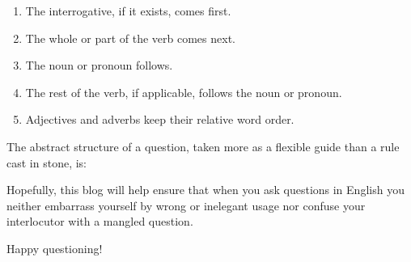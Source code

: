 \documentclass[
  12pt,
  a4paper,
]{article}
\begin{document}
\begin{enumerate}
\item
  The interrogative, if it exists, comes first.
\item
  The whole or part of the verb comes next.
\item
  The noun or pronoun follows.
\item
  The rest of the verb, if applicable, follows the noun or pronoun.
\item
  Adjectives and adverbs keep their relative word order.
\end{enumerate}

The abstract structure of a question, taken more as a flexible guide
than a rule cast in stone, is:

Hopefully, this blog will help ensure that when you ask questions in
English you neither embarrass yourself by wrong or inelegant usage nor
confuse your interlocutor with a mangled question.

Happy questioning!  \normalfont
\end{document}
